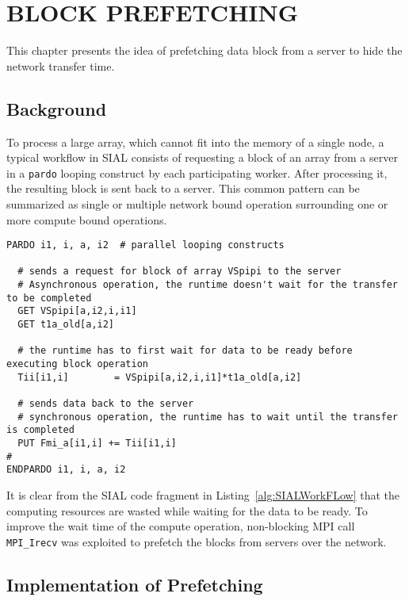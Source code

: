 \chapter{BLOCK PREFETCHING}\label{block prefetching}

This chapter presents the idea of prefetching data block from a server to hide the
network transfer time.

\section{Background}\label{prefetchingbackground}
To process a large array, which cannot fit into the memory of a single node, a typical
workflow in SIAL consists of requesting a block of an array from a server in a
\texttt{pardo} looping construct by each participating worker. After processing
it, the resulting block is sent back to a server. This common pattern can be
summarized as single or multiple network bound operation surrounding one or more
compute bound operations.

\begin{lstlisting}[caption={Code Fragment from ACESIII for CCSD calculation},
  label={alg:SIALWorkFLow}]
PARDO i1, i, a, i2  # parallel looping constructs

  # sends a request for block of array VSpipi to the server
  # Asynchronous operation, the runtime doesn't wait for the transfer to be completed
  GET VSpipi[a,i2,i,i1]
  GET t1a_old[a,i2]

  # the runtime has to first wait for data to be ready before executing block operation
  Tii[i1,i]        = VSpipi[a,i2,i,i1]*t1a_old[a,i2]

  # sends data back to the server
  # synchronous operation, the runtime has to wait until the transfer is completed
  PUT Fmi_a[i1,i] += Tii[i1,i]
#
ENDPARDO i1, i, a, i2
\end{lstlisting}

It is clear from the SIAL code fragment in Listing~\ref{alg:SIALWorkFLow} that the computing resources are wasted while
waiting for the data to be ready. To improve the wait time of the compute
operation, non-blocking MPI call \texttt{MPI\_Irecv} was exploited to prefetch
the blocks from servers over the network.

\section{Implementation of Prefetching}

